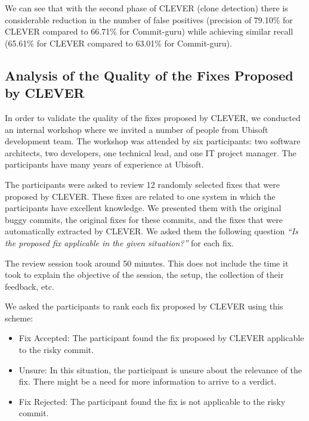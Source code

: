 \documentclass[sigconf]{acmart}
\providecommand{\tightlist}{%
  \setlength{\itemsep}{0pt}\setlength{\parskip}{0pt}}
\begin{document}
We can see that with the second phase of CLEVER (clone detection) there
is considerable reduction in the number of false positives (precision of
79.10\% for CLEVER compared to 66.71\% for Commit-guru) while achieving
similar recall (65.61\% for CLEVER compared to 63.01\% for Commit-guru).



\subsection{Analysis of the Quality of the Fixes Proposed by
CLEVER}\label{analysis-of-the-quality-of-the-fixes-proposed-by-clever}

In order to validate the quality of the fixes proposed by CLEVER, we
conducted an internal workshop where we invited a number of people from
Ubisoft development team. The workshop was attended by six participants:
two software architects, two developers, one technical lead, and one IT
project manager. The participants have many years of experience at
Ubisoft.

The participants were asked to review 12 randomly selected fixes that
were proposed by CLEVER. These fixes are related to one system in which
the participants have excellent knowledge. We presented them with the
original buggy commits, the original fixes for these commits, and the
fixes that were automatically extracted by CLEVER. We asked them the
following question \emph{``Is the proposed fix applicable in the given
situation?''} for each fix.

The review session took around 50 minutes. This does not include the
time it took to explain the objective of the session, the setup, the
collection of their feedback, etc.

We asked the participants to rank each fix proposed by CLEVER using this
scheme:

\begin{itemize}
\tightlist
\item
  Fix Accepted: The participant found the fix proposed by CLEVER
  applicable to the risky commit.
\item
  Unsure: In this situation, the participant is unsure about the
  relevance of the fix. There might be a need for more information to
  arrive to a verdict.
\item
  Fix Rejected: The participant found the fix is not applicable to the
  risky commit.
\end{itemize}
\end{document}
